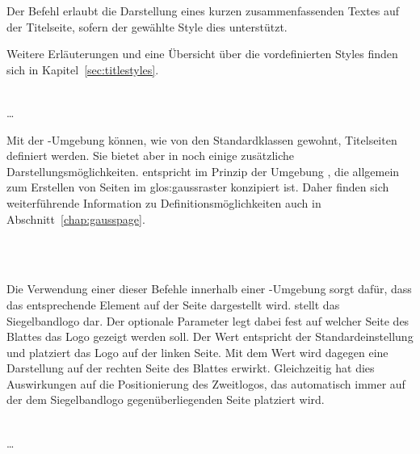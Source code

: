 Der Befehl  erlaubt die Darstellung eines kurzen
zusammenfassenden Textes auf der Titelseite, sofern der gewählte Style
dies unterstützt.

Weitere Erläuterungen und eine Übersicht über die vordefinierten Styles
finden sich in Kapitel~\ref{sec:titlestyles}.


\begin{Declaration}
  \\
  \quad\dots\\
\end{Declaration}

Mit der -Umgebung können, wie von den Standardklassen
gewohnt, Titelseiten definiert werden. Sie bietet aber in \tubslatex noch einige
zusätzliche Darstellungsmöglichkeiten.  entspricht
im Prinzip der Umgebung , die allgemein zum Erstellen
von Seiten im \gls{glos:gaussraster} konzipiert ist. Daher finden sich
weiterführende Information zu Definitionsmöglichkeiten auch in
Abschnitt~\ref{chap:gausspage}.

\begin{Declaration}
  \\
  \\
\end{Declaration}

Die Verwendung einer dieser Befehle innerhalb einer -Umgebung
sorgt dafür, dass das entsprechende Element auf der Seite dargestellt wird.
 stellt das Siegelbandlogo dar. Der optionale Parameter
 legt dabei fest auf welcher Seite des Blattes
das Logo gezeigt werden soll.
Der Wert  entspricht der Standardeinstellung und platziert das Logo auf der linken Seite.
Mit dem Wert  wird dagegen eine Darstellung auf der rechten
Seite des Blattes erwirkt. Gleichzeitig hat dies Auswirkungen
auf die Positionierung des Zweitlogos, das automatisch immer auf der 
dem Siegelbandlogo gegenüberliegenden Seite platziert wird.

\begin{Declaration}
\end{Declaration}


\begin{Declaration}
    \\
  \quad\dots\\
\end{Declaration}


